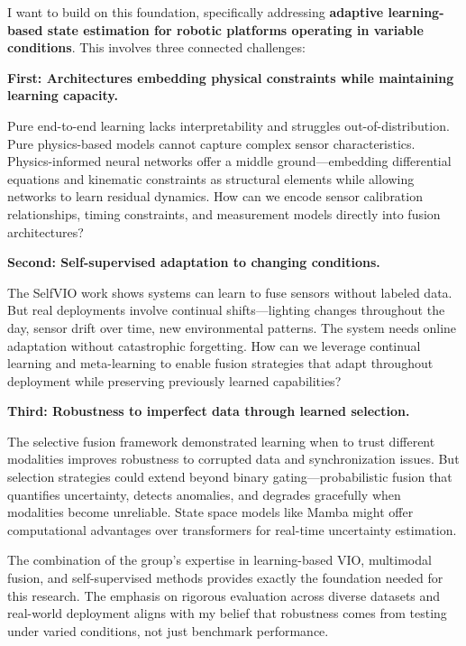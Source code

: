 \documentclass[12pt]{article}
\begin{document}
I want to build on this foundation, specifically addressing \textbf{adaptive learning-based state estimation for robotic platforms operating in variable conditions}. This involves three connected challenges:

\vspace{0.3cm}
\noindent\textbf{First: Architectures embedding physical constraints while maintaining learning capacity.}

Pure end-to-end learning lacks interpretability and struggles out-of-distribution. Pure physics-based models cannot capture complex sensor characteristics. Physics-informed neural networks offer a middle ground—embedding differential equations and kinematic constraints as structural elements while allowing networks to learn residual dynamics. How can we encode sensor calibration relationships, timing constraints, and measurement models directly into fusion architectures?

\vspace{0.2cm}
\noindent\textbf{Second: Self-supervised adaptation to changing conditions.}

The SelfVIO work shows systems can learn to fuse sensors without labeled data. But real deployments involve continual shifts—lighting changes throughout the day, sensor drift over time, new environmental patterns. The system needs online adaptation without catastrophic forgetting. How can we leverage continual learning and meta-learning to enable fusion strategies that adapt throughout deployment while preserving previously learned capabilities?

\vspace{0.2cm}
\noindent\textbf{Third: Robustness to imperfect data through learned selection.}

The selective fusion framework demonstrated learning when to trust different modalities improves robustness to corrupted data and synchronization issues. But selection strategies could extend beyond binary gating—probabilistic fusion that quantifies uncertainty, detects anomalies, and degrades gracefully when modalities become unreliable. State space models like Mamba might offer computational advantages over transformers for real-time uncertainty estimation.

\vspace{0.2cm}
The combination of the group's expertise in learning-based VIO, multimodal fusion, and self-supervised methods provides exactly the foundation needed for this research. The emphasis on rigorous evaluation across diverse datasets and real-world deployment aligns with my belief that robustness comes from testing under varied conditions, not just benchmark performance.
\end{document}
